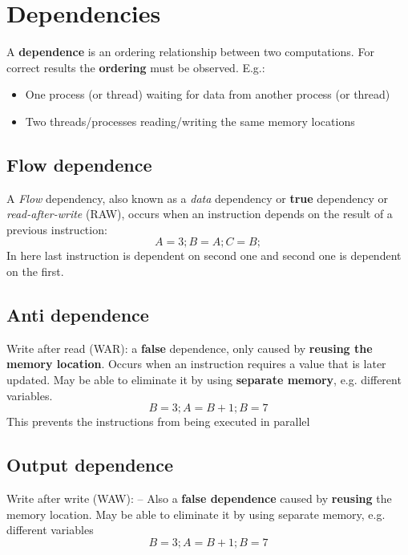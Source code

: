\documentclass{article}
\begin{document}
\tableofcontents

\newpage

\section{Dependencies}

\begin{flushleft}
A \textbf{dependence} is an ordering relationship between two computations. For correct results the \textbf{ordering} must be observed. E.g.:
\begin{itemize}
  \item One process (or thread) waiting for data from another process (or thread)
  \item Two threads/processes reading/writing the same memory locations
\end{itemize}
\end{flushleft}

\subsection{Flow dependence}

\begin{flushleft}
A \textit{Flow} dependency, also known as a \textit{data} dependency or \textbf{true} dependency or \textit{read-after-write} (RAW), occurs when an instruction depends on the result of a previous instruction:
\[ A = 3; B = A; C = B; \]
In here last instruction is dependent on second one and second one is dependent on the first.
\end{flushleft}

\subsection{Anti dependence}
\begin{flushleft}
Write after read (WAR): a \textbf{false} dependence, only caused by \textbf{reusing the memory location}. Occurs when an instruction requires a value that is later updated. May be able to eliminate it by using \textbf{separate memory}, e.g. different variables.
\[ B = 3; A = B + 1; B = 7 \]
This prevents the instructions from being executed in parallel
\end{flushleft}

\subsection{Output	dependence}
\begin{flushleft}
Write after write (WAW): – Also a \textbf{false dependence} caused by \textbf{reusing} the memory location. May be able to eliminate it by using separate memory, e.g. different variables
\[ B = 3; A = B + 1; B = 7 \]
\end{flushleft}
\end{document}
